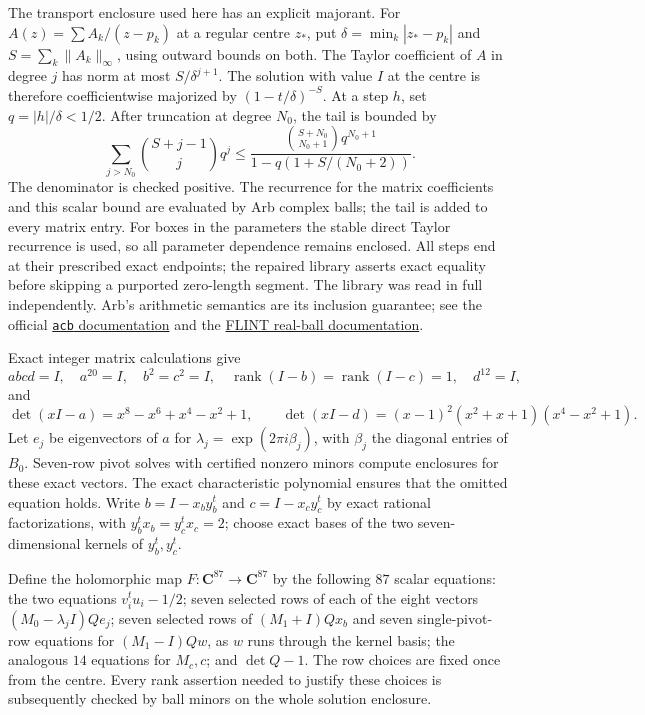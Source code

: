The transport enclosure used here has an explicit majorant.
For $A(z)=\sum A_k/(z-p_k)$ at a regular centre $z_*$, put
$\delta=\min_k|z_*-p_k|$ and
$S=\sum_k\|A_k\|_\infty$, using outward bounds on both.
The Taylor coefficient of $A$ in degree $j$ has norm at most
$S/\delta^{j+1}$.  The solution with value $I$ at the centre
is therefore coefficientwise majorized by
$(1-t/\delta)^{-S}$.  At a step $h$, set $q=|h|/\delta<1/2$.
After truncation at degree $N_0$, the tail is bounded by
\[
 \sum_{j>N_0}\binom{S+j-1}{j}q^j
 \leq
 \frac{\binom{S+N_0}{N_0+1}q^{N_0+1}}
 {1-q(1+S/(N_0+2))}.
\]
The denominator is checked positive.  The recurrence for the
matrix coefficients and this scalar bound are evaluated by
Arb complex balls; the tail is added to every matrix entry.
For boxes in the parameters the stable direct Taylor recurrence
is used, so all parameter dependence remains enclosed.
All steps end at their prescribed exact endpoints; the repaired
library asserts exact equality before skipping a purported
zero-length segment.  The library was read in full independently.
Arb's arithmetic semantics are its inclusion guarantee; see the
official \href{https://python-flint.readthedocs.io/en/latest/acb.html}
{\texttt{acb} documentation} and the
\href{https://flintlib.org/doc/arb.html}{FLINT real-ball documentation}.

Exact integer matrix calculations give
\[
 abcd=I,\quad a^{20}=I,\quad b^2=c^2=I,\quad
 \operatorname{rank}(I-b)=\operatorname{rank}(I-c)=1,
 \quad d^{12}=I,
\]
and
\[
 \det(xI-a)=x^8-x^6+x^4-x^2+1,\qquad
 \det(xI-d)=(x-1)^2(x^2+x+1)(x^4-x^2+1).
\]
Let $e_j$ be eigenvectors of $a$ for
$\lambda_j=\exp(2\pi i\beta_j)$, with $\beta_j$ the diagonal
entries of $B_0$.  Seven-row pivot solves with certified nonzero
minors compute enclosures for these exact vectors.  The exact
characteristic polynomial ensures that the omitted equation
holds.  Write $b=I-x_by_b^t$ and $c=I-x_cy_c^t$ by exact
rational factorizations, with $y_b^tx_b=y_c^tx_c=2$; choose exact
bases of the two seven-dimensional kernels of $y_b^t,y_c^t$.

Define the holomorphic map $F:\mathbf C^{87}\to\mathbf C^{87}$
by the following $87$ scalar equations: the two equations
$v_i^tu_i-1/2$; seven selected rows of each of the eight vectors
$(M_0-\lambda_j I)Qe_j$; seven selected rows of
$(M_1+I)Qx_b$ and seven single-pivot-row equations for
$(M_1-I)Qw$, as $w$ runs through the kernel basis; the analogous
$14$ equations for $M_c,c$; and $\det Q-1$.
The row choices are fixed once from the centre.  Every rank
assertion needed to justify these choices is subsequently
checked by ball minors on the whole solution enclosure.

